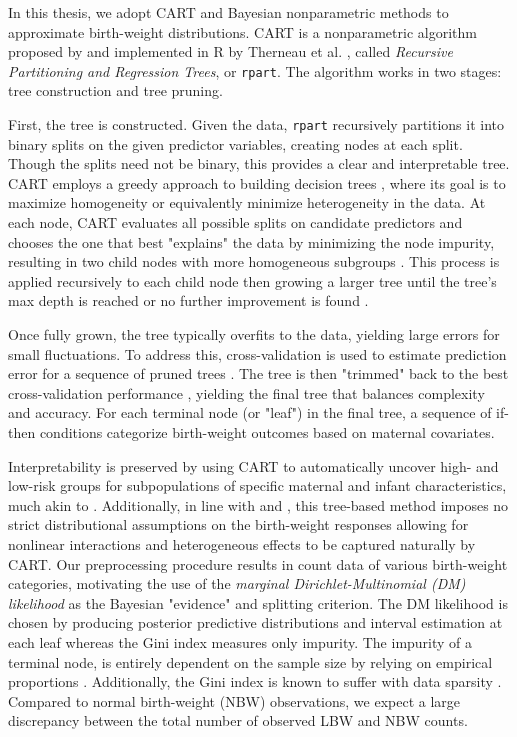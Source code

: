 In this thesis, we adopt CART and Bayesian nonparametric methods to approximate birth-weight distributions. CART is a nonparametric algorithm proposed by \textcite{breiman1984classification} and implemented in R by Therneau et al. \parencite{intro_to_rpart}, called \textit{Recursive Partitioning and Regression Trees}, or \texttt{rpart}. The algorithm works in two stages: tree construction and tree pruning. 
 
First, the tree is constructed. Given the data, \texttt{rpart} recursively partitions it into binary splits on the given predictor variables, creating nodes at each split. Though the splits need not be binary, this provides a clear and interpretable tree. CART employs a greedy approach to building decision trees \parencite{cart_greedy}, where its goal is to maximize homogeneity or equivalently minimize heterogeneity in the data. At each node, CART evaluates all possible splits on candidate predictors and chooses the one that best "explains" the data by minimizing the node impurity, resulting in two child nodes with more homogeneous subgroups \parencite{intro_to_rpart}. This process is applied recursively to each child node then growing a larger tree until the tree's max depth is reached or no further improvement is found \parencite{intro_to_rpart}.

Once fully grown, the tree typically overfits to the data, yielding large errors for small fluctuations. To address this, cross-validation is used to estimate prediction error for a sequence of pruned trees \parencite{intro_to_rpart}. The tree is then "trimmed" back to the best cross-validation performance \parencite{intro_to_rpart}, yielding the final tree that balances complexity and accuracy. For each terminal node (or "leaf") in the final tree, a sequence of if-then conditions categorize birth-weight outcomes based on maternal covariates.

Interpretability is preserved by using CART to automatically uncover high- and low-risk groups for subpopulations of specific maternal and infant characteristics, much akin to \textcite{KITSANTAS2006275}. Additionally, in line with \textcite{dunson2008} and \textcite{jain2024}, this tree-based method imposes no strict distributional assumptions on the birth-weight responses allowing for nonlinear interactions and heterogeneous effects to be captured naturally by CART. Our preprocessing procedure results in count data of various birth-weight categories, motivating the use of the \emph{marginal Dirichlet-Multinomial (DM) likelihood} as the Bayesian "evidence" and splitting criterion. The DM likelihood is chosen by producing posterior predictive distributions and interval estimation at each leaf whereas the Gini index measures only impurity. The impurity of a terminal node, is entirely dependent on the sample size by relying on empirical proportions \parencite{stackexchangeGiniDecrease}. Additionally, the Gini index is known to suffer with data sparsity \parencite{ekamperiDecisionTrees}. Compared to normal birth-weight (NBW) observations, we expect a large discrepancy between the total number of observed LBW and NBW counts.

